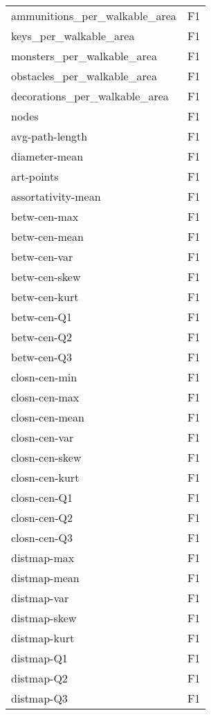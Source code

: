 \documentclass{report}
\begin{document}
\begin{longtable}{ll}
	ammunitions\_per\_walkable\_area &             F1 \\
	keys\_per\_walkable\_area        &             F1 \\
	monsters\_per\_walkable\_area    &             F1 \\
	obstacles\_per\_walkable\_area   &             F1 \\
	decorations\_per\_walkable\_area &             F1 \\
	nodes                         &             F1 \\
	avg-path-length               &             F1 \\
	diameter-mean                 &             F1 \\
	art-points                    &             F1 \\
	assortativity-mean            &             F1 \\
	betw-cen-max                  &             F1 \\
	betw-cen-mean                 &             F1 \\
	betw-cen-var                  &             F1 \\
	betw-cen-skew                 &             F1 \\
	betw-cen-kurt                 &             F1 \\
	betw-cen-Q1                   &             F1 \\
	betw-cen-Q2                   &             F1 \\
	betw-cen-Q3                   &             F1 \\
	closn-cen-min                 &             F1 \\
	closn-cen-max                 &             F1 \\
	closn-cen-mean                &             F1 \\
	closn-cen-var                 &             F1 \\
	closn-cen-skew                &             F1 \\
	closn-cen-kurt                &             F1 \\
	closn-cen-Q1                  &             F1 \\
	closn-cen-Q2                  &             F1 \\
	closn-cen-Q3                  &             F1 \\
	distmap-max                   &             F1 \\
	distmap-mean                  &             F1 \\
	distmap-var                   &             F1 \\
	distmap-skew                  &             F1 \\
	distmap-kurt                  &             F1 \\
	distmap-Q1                    &             F1 \\
	distmap-Q2                    &             F1 \\
	distmap-Q3                    &             F1 \\
\end{longtable}
\end{document}
